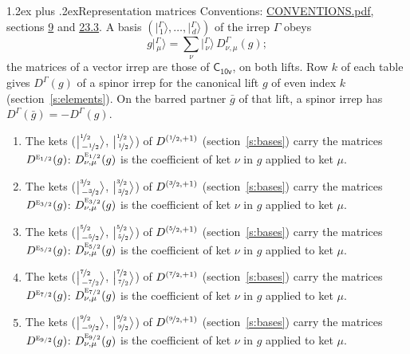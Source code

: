 \documentclass[10pt,a4paper]{article}
\makeatletter
\renewcommand\section{\@startsection{section}{1}{\z@}{-3ex plus -1ex minus -.2ex}%
  {1.2ex plus .2ex}{\normalfont\large\sffamily\bfseries\color{parttitle}}}
\numberwithin{equation}{section}
\newcommand{\grp}[1]{\mathsf{#1}}
\newcommand{\irr}[1]{\text{\normalfont\scshape #1}}
\newcommand{\irrJp}[2]{D^{(#1,#2)}}
\newcommand{\repD}[1]{D^{#1}}
\newcommand{\intx}{\mu}
\newcommand{\jm}[2]{\bigl\lvert{}^{#1}_{\,#2}\bigr\rangle}
\newcommand{\irket}[2]{\bigl\lvert{}^{#1}_{\,#2}\bigr\rangle}
\newcommand{\barred}[1]{\bar{#1}}
\newenvironment{romanlist}{\begin{enumerate}%
\renewcommand{\labelenumi}{(\roman{enumi})}}%
  {\end{enumerate}}
\makeatother
\begin{document}
\section{Representation matrices}\label{s:irrep_matrices}
Conventions: \href{../../CONVENTIONS.pdf}{CONVENTIONS.pdf}, sections \href{../../../rotation/CONVENTIONS.pdf\#conv.9}{9} and \href{../../CONVENTIONS.pdf\#conv.23.3}{23.3}.
\leavevmode\label{n:vector.ket.partner}\label{n:index.partner}\label{n:matrix.irrep}\label{n:index.partner.summed}A basis $(\irket{\Gamma}{1}, \dots, \irket{\Gamma}{d})$ of the irrep $\Gamma$ obeys
\begin{equation}\label{e:partner}g\irket{\Gamma}{\intx} = \sum_\nu \irket{\Gamma}{\nu}\, \repD{\Gamma}_{\nu,\intx}(g);\end{equation}
the matrices of a vector irrep are those of \href{../../../rotation/data/pdf/C10v.pdf}{$\grp{C_{10v}}$}, on both lifts. Row $k$ of each table gives $\repD{\Gamma}(g)$ of a spinor irrep for the canonical lift $g$ of even index $k$ (section~\ref{s:elements}). On the barred partner $\barred{g}$ of that lift, a spinor irrep has $\repD{\Gamma}(\barred{g}) = -\repD{\Gamma}(g)$.
\begin{romanlist}\raggedright
\item The kets ($\jm{\nicefrac{1}{2}}{-\nicefrac{1}{2}}$, $\jm{\nicefrac{1}{2}}{\nicefrac{1}{2}}$) of $\irrJp{\nicefrac{1}{2}}{+1}$ (section~\ref{s:bases}) carry the matrices $\repD{\irr{e}_{1/2}}(g)$: $\repD{\irr{e}_{1/2}}_{\nu,\intx}(g)$ is the coefficient of ket $\nu$ in $g$ applied to ket $\intx$.
\item The kets ($\jm{\nicefrac{3}{2}}{-\nicefrac{3}{2}}$, $\jm{\nicefrac{3}{2}}{\nicefrac{3}{2}}$) of $\irrJp{\nicefrac{3}{2}}{+1}$ (section~\ref{s:bases}) carry the matrices $\repD{\irr{e}_{3/2}}(g)$: $\repD{\irr{e}_{3/2}}_{\nu,\intx}(g)$ is the coefficient of ket $\nu$ in $g$ applied to ket $\intx$.
\item The kets ($\jm{\nicefrac{5}{2}}{-\nicefrac{5}{2}}$, $\jm{\nicefrac{5}{2}}{\nicefrac{5}{2}}$) of $\irrJp{\nicefrac{5}{2}}{+1}$ (section~\ref{s:bases}) carry the matrices $\repD{\irr{e}_{5/2}}(g)$: $\repD{\irr{e}_{5/2}}_{\nu,\intx}(g)$ is the coefficient of ket $\nu$ in $g$ applied to ket $\intx$.
\item The kets ($\jm{\nicefrac{7}{2}}{-\nicefrac{7}{2}}$, $\jm{\nicefrac{7}{2}}{\nicefrac{7}{2}}$) of $\irrJp{\nicefrac{7}{2}}{+1}$ (section~\ref{s:bases}) carry the matrices $\repD{\irr{e}_{7/2}}(g)$: $\repD{\irr{e}_{7/2}}_{\nu,\intx}(g)$ is the coefficient of ket $\nu$ in $g$ applied to ket $\intx$.
\item The kets ($\jm{\nicefrac{9}{2}}{-\nicefrac{9}{2}}$, $\jm{\nicefrac{9}{2}}{\nicefrac{9}{2}}$) of $\irrJp{\nicefrac{9}{2}}{+1}$ (section~\ref{s:bases}) carry the matrices $\repD{\irr{e}_{9/2}}(g)$: $\repD{\irr{e}_{9/2}}_{\nu,\intx}(g)$ is the coefficient of ket $\nu$ in $g$ applied to ket $\intx$.
\end{romanlist}
\end{document}
